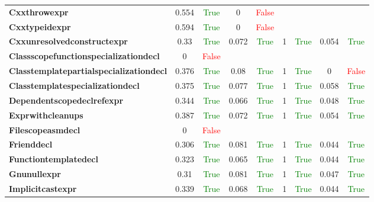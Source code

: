 \documentclass{article}
\begin{document}
\begin{xltabular}{\textwidth}{lcccccccc}
\textbf{{\fontsize{10}{12}\selectfont Cxxthrowexpr}}& 0.554&\textcolor{green}{True}& 0&\textcolor{red}{False} \\[0.5ex]
\textbf{{\fontsize{10}{12}\selectfont Cxxtypeidexpr}}& 0.594&\textcolor{green}{True}& 0&\textcolor{red}{False} \\[0.5ex]
\textbf{{\fontsize{10}{12}\selectfont Cxxunresolvedconstructexpr}}& 0.33&\textcolor{green}{True}& 0.072&\textcolor{green}{True}& 1&\textcolor{green}{True}& 0.054&\textcolor{green}{True} \\[0.5ex]
\textbf{{\fontsize{10}{12}\selectfont Classscopefunctionspecializationdecl}}& 0&\textcolor{red}{False} \\[0.5ex]
\textbf{{\fontsize{10}{12}\selectfont Classtemplatepartialspecializationdecl}}& 0.376&\textcolor{green}{True}& 0.08&\textcolor{green}{True}& 1&\textcolor{green}{True}& 0&\textcolor{red}{False} \\[0.5ex]
\textbf{{\fontsize{10}{12}\selectfont Classtemplatespecializationdecl}}& 0.375&\textcolor{green}{True}& 0.077&\textcolor{green}{True}& 1&\textcolor{green}{True}& 0.058&\textcolor{green}{True} \\[0.5ex]
\textbf{{\fontsize{10}{12}\selectfont Dependentscopedeclrefexpr}}& 0.344&\textcolor{green}{True}& 0.066&\textcolor{green}{True}& 1&\textcolor{green}{True}& 0.048&\textcolor{green}{True} \\[0.5ex]
\textbf{{\fontsize{10}{12}\selectfont Exprwithcleanups}}& 0.387&\textcolor{green}{True}& 0.072&\textcolor{green}{True}& 1&\textcolor{green}{True}& 0.054&\textcolor{green}{True} \\[0.5ex]
\textbf{{\fontsize{10}{12}\selectfont Filescopeasmdecl}}& 0&\textcolor{red}{False} \\[0.5ex]
\textbf{{\fontsize{10}{12}\selectfont Frienddecl}}& 0.306&\textcolor{green}{True}& 0.081&\textcolor{green}{True}& 1&\textcolor{green}{True}& 0.044&\textcolor{green}{True} \\[0.5ex]
\textbf{{\fontsize{10}{12}\selectfont Functiontemplatedecl}}& 0.323&\textcolor{green}{True}& 0.065&\textcolor{green}{True}& 1&\textcolor{green}{True}& 0.044&\textcolor{green}{True} \\[0.5ex]
\textbf{{\fontsize{10}{12}\selectfont Gnunullexpr}}& 0.31&\textcolor{green}{True}& 0.081&\textcolor{green}{True}& 1&\textcolor{green}{True}& 0.047&\textcolor{green}{True} \\[0.5ex]
\textbf{{\fontsize{10}{12}\selectfont Implicitcastexpr}}& 0.339&\textcolor{green}{True}& 0.068&\textcolor{green}{True}& 1&\textcolor{green}{True}& 0.044&\textcolor{green}{True} \\[0.5ex]

\end{xltabular}
\end{document}
